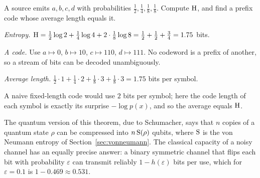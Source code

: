 \begin{example}\label{ex:huffman}
  A source emits $a,b,c,d$ with probabilities $\tfrac12,\tfrac14,\tfrac18,\tfrac18$. Compute $\mathrm{H}$, and find a prefix code whose average length equals it.
\end{example}
\begin{solution}
  \begin{steps}
    \item \emph{Entropy.} $\mathrm{H}=\tfrac12\log2+\tfrac14\log4+2\cdot\tfrac18\log8=\tfrac12+\tfrac12+\tfrac34=1.75$ bits.
    \item \emph{A code.} Use $a\mapsto0$, $b\mapsto10$, $c\mapsto110$, $d\mapsto111$. No codeword is a prefix of another, so a stream of bits can be decoded unambiguously.
    \item \emph{Average length.} $\tfrac12\cdot1+\tfrac14\cdot2+\tfrac18\cdot3+\tfrac18\cdot3=1.75$ bits per symbol.
  \end{steps}
  A naive fixed-length code would use $2$ bits per symbol; here the code length of each symbol is exactly its surprise $-\log p(x)$, and so the average equals $\mathrm{H}$.
\end{solution}

\begin{lookahead}
  The quantum version of this theorem, due to Schumacher, says that $n$ copies of a quantum state $\rho$ can be compressed into $n\,\mathrm{S}(\rho)$ qubits, where $\mathrm{S}$ is the von Neumann entropy of Section~\ref{sec:vonneumann}. The classical capacity of a noisy channel has an equally precise answer: a binary symmetric channel that flips each bit with probability $\varepsilon$ can transmit reliably
  $1-h(\varepsilon)$ bits per use, which for $\varepsilon=0.1$ is $1-0.469\approx0.531$.
\end{lookahead}

